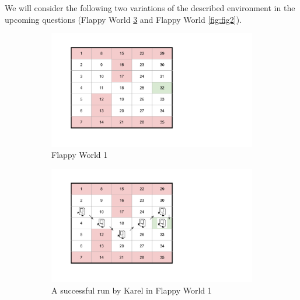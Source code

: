 We will consider the following two variations of the described environment in the upcoming questions (Flappy World \ref{fig:fig1} and Flappy World \ref{fig:fig2}).  



\begin{figure}[ht]
\begin{subfigure}{.5\textwidth}
  \centering
  \includegraphics[width=.8\linewidth]{images/FlappyWorld1.pdf}  
  \caption{Flappy World 1}
  \label{fig:fig1.a}
\end{subfigure}
\begin{subfigure}{.5\textwidth}
  \centering
  \includegraphics[width=.8\linewidth]{images/FlappyWorld1_.pdf}  
  \caption{A successful run by Karel in Flappy World 1}
  \label{fig:fig1.b}
\end{subfigure}
\caption{}
\label{fig:fig1}
\end{figure}

\clearpage 

\begin{enumerate}[(a)]

  

  

  

  

  

\end{enumerate}